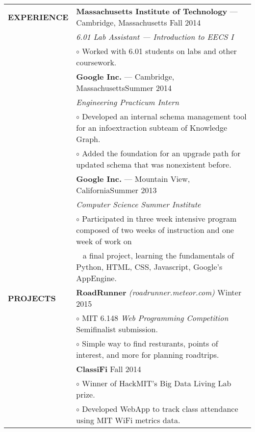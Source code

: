 \documentclass[11pt,letterpaper]{article}
\begin{document}
\begin{tabular}{@{}lp{6.6in}}
\textbf{EXPERIENCE}
&\textbf{Massachusetts Institute of Technology} --- Cambridge, Massachusetts \hfill Fall 2014\\
&\emph{6.01 Lab Assistant --- Introduction to EECS I}\\
&\hspace{10pt}$\circ$ Worked with 6.01 students on labs and other coursework.\\

&\textbf{Google Inc.} --- Cambridge, Massachusetts\hfill Summer 2014\\
&\emph{Engineering Practicum Intern}\\
&\hspace{10pt}$\circ$ Developed an internal schema management tool for an infoextraction subteam of Knowledge Graph. \\
&\hspace{10pt}$\circ$ Added the foundation for an upgrade path for updated schema that was nonexistent before.\\

&\textbf{Google Inc.} --- Mountain View, California\hfill Summer 2013\\
&\emph{Computer Science Summer Institute}\\
&\hspace{10pt}$\circ$ Participated in three week intensive program composed of two weeks of instruction and one week of work on\\ &\ \hspace{3ex} a final project, learning the fundamentals of Python, HTML, CSS, Javascript, Google's AppEngine.\\

\textbf{PROJECTS}

&\textbf{RoadRunner} \emph{(roadrunner.meteor.com)} \hfill Winter 2015\\
&\hspace{10pt}$\circ$ MIT 6.148 \emph{Web Programming Competition} Semifinalist submission. \\
&\hspace{10pt}$\circ$ Simple way to find resturants, points of interest, and more for planning roadtrips. \\

&\textbf{ClassiFi} \hfill Fall 2014\\
&\hspace{10pt}$\circ$ Winner of HackMIT's Big Data Living Lab prize. \\
&\hspace{10pt}$\circ$ Developed WebApp to track class attendance using MIT WiFi metrics data. \\


\end{tabular}
\end{document}
